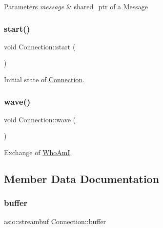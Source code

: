 \begin{DoxyParams}{Parameters}
{\em message} & shared\+\_\+ptr of a \mbox{\hyperlink{classMessage}{Message}} \\
\hline
\end{DoxyParams}
\mbox{\label{classConnection_a47c25a31352a71e2a6902d37fc5fa2ba}} 
\subsubsection{\texorpdfstring{start()}{start()}}
{\footnotesize\ttfamily void Connection\+::start (\begin{DoxyParamCaption}{ }\end{DoxyParamCaption})}



Initial state of \mbox{\hyperlink{classConnection}{Connection}}. 

\mbox{\label{classConnection_a2e12f0ca3e66692c1bc3ad858dfa2d4e}} 
\subsubsection{\texorpdfstring{wave()}{wave()}}
{\footnotesize\ttfamily void Connection\+::wave (\begin{DoxyParamCaption}{ }\end{DoxyParamCaption})}



Exchange of \mbox{\hyperlink{classWhoAmI}{Who\+AmI}}. 



\subsection{Member Data Documentation}
\mbox{\label{classConnection_a99e0a006406f126fc4c538ba71532397}} 
\subsubsection{\texorpdfstring{buffer}{buffer}}
{\footnotesize\ttfamily asio\+::streambuf Connection\+::buffer\hspace{0.3cm}{\ttfamily [private]}}

